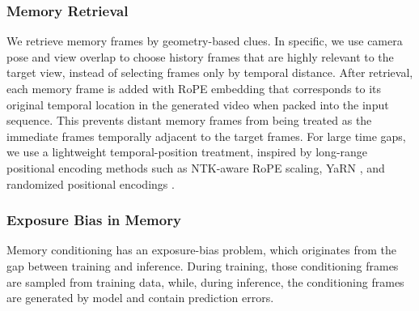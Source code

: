 \documentclass{llmxive}
\begin{document}

\subsubsection{Memory Retrieval}

We retrieve memory frames by geometry-based clues. In specific, we use camera pose and view overlap to choose history frames that are highly relevant to the target view, instead of selecting frames only by temporal distance.
After retrieval, each memory frame is added with RoPE embedding that corresponds to its original temporal location in the generated video when packed into the input sequence.
This prevents distant memory frames from being treated as the immediate frames temporally adjacent to the target frames.
For large time gaps, we use a lightweight temporal-position treatment, inspired
by long-range positional encoding methods such as NTK-aware RoPE scaling, YaRN
\citep{peng2023yarn}, and randomized positional encodings
\citep{ruoss2023randomized}.

\subsubsection{Exposure Bias in Memory}

Memory conditioning has an exposure-bias problem, which originates from the gap between training and inference.
During training, those conditioning frames are sampled from training data, while, during inference, the conditioning frames are generated by model and contain
prediction errors.
\end{document}
